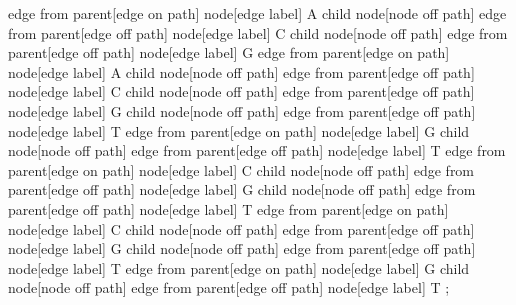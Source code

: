 {{{{{{            edge from parent[edge on path] node[edge label] {A}
            }
            child {
            node[node off path] {}
            edge from parent[edge off path] node[edge label] {C}
            }
            child {
            node[node off path] {}
            edge from parent[edge off path] node[edge label] {G}
            }
          edge from parent[edge on path] node[edge label] {A}
          }
          child {
          node[node off path] {}
          edge from parent[edge off path] node[edge label] {C}
          }
          child {
          node[node off path] {}
          edge from parent[edge off path] node[edge label] {G}
          }
          child {
          node[node off path] {}
          edge from parent[edge off path] node[edge label] {T}
          }
        edge from parent[edge on path] node[edge label] {G}
        }
        child {
        node[node off path] {}
        edge from parent[edge off path] node[edge label] {T}
        }
      edge from parent[edge on path] node[edge label] {C}
      }
      child {
      node[node off path] {}
      edge from parent[edge off path] node[edge label] {G}
      }
      child {
      node[node off path] {}
      edge from parent[edge off path] node[edge label] {T}
      }
    edge from parent[edge on path] node[edge label] {C}
    }
    child {
    node[node off path] {}
    edge from parent[edge off path] node[edge label] {G}
    }
    child {
    node[node off path] {}
    edge from parent[edge off path] node[edge label] {T}
    }
  edge from parent[edge on path] node[edge label] {G}
  }
  child {
  node[node off path] {}
  edge from parent[edge off path] node[edge label] {T}
  }
;
